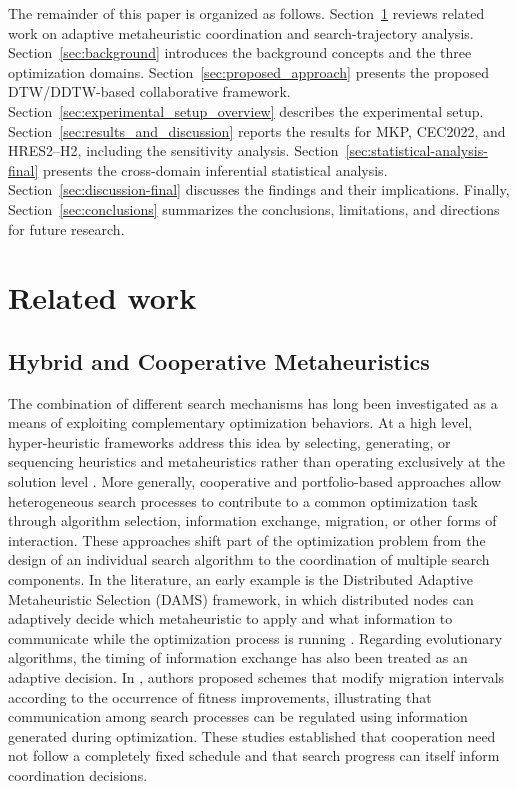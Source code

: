 \documentclass[review]{elsarticle}
\begin{document}
The remainder of this paper is organized as follows. Section~\ref{sec:related_work} reviews related work on adaptive metaheuristic coordination and search-trajectory analysis. Section~\ref{sec:background} introduces the background concepts and the three optimization domains. Section~\ref{sec:proposed_approach} presents the proposed DTW/DDTW-based collaborative framework. Section~\ref{sec:experimental_setup_overview} describes the experimental setup. Section~\ref{sec:results_and_discussion} reports the results for MKP, CEC2022, and HRES2--H2, including the sensitivity analysis. Section~\ref{sec:statistical-analysis-final} presents the cross-domain inferential statistical analysis. Section~\ref{sec:discussion-final} discusses the findings and their implications. Finally, Section~\ref{sec:conclusions} summarizes the conclusions, limitations, and directions for future research.




\section{Related work}
\label{sec:related_work}
\subsection{Hybrid and Cooperative Metaheuristics}
\label{subsec:hybrid_cooperative}

The combination of different search mechanisms has long been investigated as
a means of exploiting complementary optimization behaviors. At a high level,
hyper-heuristic frameworks address this idea by selecting, generating, or
sequencing heuristics and metaheuristics rather than operating exclusively
at the solution level \cite{drake2020recent,dokeroglu2024hyper}. More
generally, cooperative and portfolio-based approaches allow heterogeneous
search processes to contribute to a common optimization task through
algorithm selection, information exchange, migration, or other forms of
interaction. These approaches shift part of the optimization problem from
the design of an individual search algorithm to the coordination of multiple
search components. In the literature, an early example is the Distributed Adaptive Metaheuristic Selection (DAMS) framework, in which distributed nodes can adaptively decide which metaheuristic to apply and what information to communicate while the
optimization process is running \cite{derbel2011-dams}. Regarding evolutionary algorithms, the timing of information exchange has also been treated as an adaptive decision. In \cite{mambrini2015design}, authors proposed schemes that modify migration intervals according to the occurrence of fitness improvements, illustrating that communication among search processes can be regulated using information generated during optimization. These studies established that cooperation need not follow a completely fixed schedule and that search progress can itself inform coordination decisions.
\end{document}
